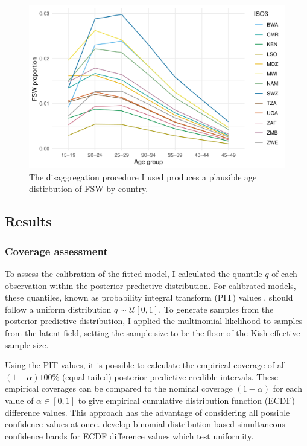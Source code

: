 \documentclass[a4paper, nobind]{templates/ociamthesis}
\begin{document}
\begin{figure}

{\centering \includegraphics[width=0.95\linewidth]{resources/multi-agyw/20230627-144735-3da88508/depends/age-disagg-fsw-line} 

}

\caption{The disaggregation procedure I used produces a plausible age distirbution of FSW by country.}\label{fig:age-disagg-fsw-line}
\end{figure}

\hypertarget{results}{%
\subsection{Results}\label{results}}

\hypertarget{coverage-assessment}{%
\subsubsection{Coverage assessment}\label{coverage-assessment}}

To assess the calibration of the fitted model, I calculated the quantile \(q\) of each observation within the posterior predictive distribution.
For calibrated models, these quantiles, known as probability integral transform (PIT) values \autocite{dawid1984present,bosse2022scoringutils}, should follow a uniform distribution \(q \sim \mathcal{U}[0, 1]\).
To generate samples from the posterior predictive distribution, I applied the multinomial likelihood to samples from the latent field, setting the sample size to be the floor of the Kish effective sample size.

Using the PIT values, it is possible to calculate the empirical coverage of all \((1 - \alpha)100\)\% (equal-tailed) posterior predictive credible intervals.
These empirical coverages can be compared to the nominal coverage \((1 - \alpha)\) for each value of \(\alpha \in [0, 1]\) to give empirical cumulative distribution function (ECDF) difference values.
This approach has the advantage of considering all possible confidence values at once.
\textcite{sailynoja2021graphical} develop binomial distribution-based simultaneous confidence bands for ECDF difference values which test uniformity.
\end{document}
